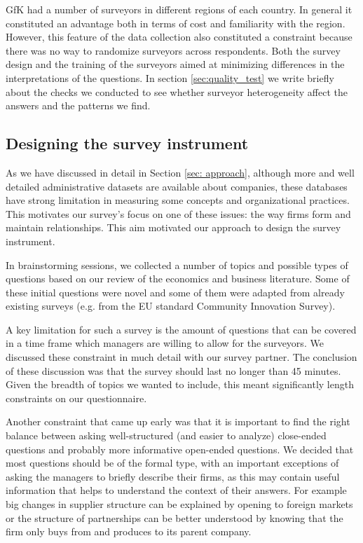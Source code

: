 \documentclass[final, dvipsnames, authoryear,12pt]{elsarticle}
\begin{document}
GfK had a number of surveyors in different regions of each country. In general it constituted an advantage both in terms of cost and familiarity with the region. However, this feature of the data collection also constituted a constraint because there was no way to randomize surveyors across respondents. Both the survey design and the training of the surveyors aimed at minimizing differences in the interpretations of the questions. In section \ref{sec:quality_test} we write briefly about the checks we conducted to see whether surveyor heterogeneity affect the answers and the patterns we find.





\subsection{Designing the survey instrument}

As we have discussed in detail in Section \ref{sec: approach}, although more and well detailed administrative datasets are available about companies, these databases have strong limitation in measuring some concepts and organizational practices. This motivates our survey's focus on one of these issues: the way firms form and maintain relationships. This aim motivated our approach to design the survey instrument.

In brainstorming sessions, we collected a number of topics and possible types of questions based on our review of the economics and business literature. Some of these initial questions were novel and some of them were adapted from already existing surveys (e.g. from the EU standard Community Innovation Survey). 

A key limitation for such a survey is the amount of questions that can be covered in a time frame which managers are willing to allow for the surveyors. We discussed these constraint in much detail with our survey partner. The conclusion of these discussion was that the survey should last no longer than 45 minutes. Given the breadth of topics we wanted to include, this meant significantly length constraints on our questionnaire. 

Another constraint that came up early was that it is important to find the right balance between asking well-structured (and easier to analyze) close-ended questions and probably more informative open-ended questions. We decided that most questions should be of the formal type,  with an important exceptions of asking the managers to briefly describe their firms, as this may contain useful information that helps to understand the context of their answers. For example big changes in supplier structure can be explained by opening to foreign markets or the structure of partnerships can be better understood by knowing that the firm only buys from and produces to its parent company.
\end{document}
